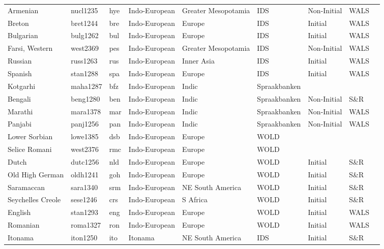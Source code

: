 \begin{longtable}{lllllllll}
  Armenian & nucl1235 & hye & Indo-European & Greater Mesopotamia & IDS & Non-Initial & WALS &  \\ 
  Breton & bret1244 & bre & Indo-European & Europe & IDS & Initial & WALS &  \\ 
  Bulgarian & bulg1262 & bul & Indo-European & Europe & IDS & Initial & WALS &  \\ 
  Farsi, Western & west2369 & pes & Indo-European & Greater Mesopotamia & IDS & Non-Initial & WALS &  \\ 
  Russian & russ1263 & rus & Indo-European & Inner Asia & IDS & Initial & WALS &  \\ 
  Spanish & stan1288 & spa & Indo-European & Europe & IDS & Initial & WALS &  \\ 
  Kotgarhi & maha1287 & bfz & Indo-European & Indic & Spraakbanken &  &  &  \\ 
  Bengali & beng1280 & ben & Indo-European & Indic & Spraakbanken & Non-Initial & S\&R & \cite[63...]{hudson_bengali1965.pdf} \\ 
  Marathi & mara1378 & mar & Indo-European & Indic & Spraakbanken & Non-Initial & WALS &  \\ 
  Panjabi & panj1256 & pan & Indo-European & Indic & Spraakbanken & Non-Initial & WALS &  \\ 
  Lower Sorbian & lowe1385 & dsb & Indo-European & Europe & WOLD &  &  &  \\ 
  Selice Romani & west2376 & rmc & Indo-European & Europe & WOLD &  &  &  \\ 
  Dutch & dutc1256 & nld & Indo-European & Europe & WOLD & Initial & S\&R & \cite{DutchQuestionWords} \\ 
  Old High German & oldh1241 & goh & Indo-European & Europe & WOLD & Initial & S\&R & \cite[54]{axel_old-high-german-syntax2007.pdf} \\ 
  Saramaccan & sara1340 & srm & Indo-European & NE South America & WOLD & Initial & S\&R & \cite[30]{byrne_saramaccan1985.pdf} \\ 
  Seychelles Creole & sese1246 & crs & Indo-European & S Africa & WOLD & Initial & S\&R & \cite[187]{corne_seychelles-creole1977.pdf} \\ 
  English & stan1293 & eng & Indo-European & Europe & WOLD & Initial & WALS &  \\ 
  Romanian & roma1327 & ron & Indo-European & Europe & WOLD & Initial & WALS &  \\ 
  Itonama & iton1250 & ito & Itonama & NE South America & IDS & Initial & S\&R & \cite[251,255]{crevels_itonama2012_o} \\ 

\end{longtable}
